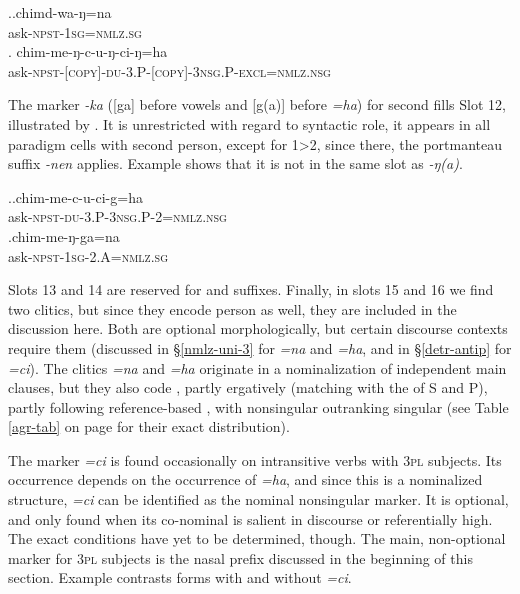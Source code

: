 	\ex.\ag.chimd-wa-ŋ=na\\
	ask{\scshape -npst-1sg=nmlz.sg}\\
	\bg. chim-me-ŋ-c-u-ŋ-ci-ŋ=ha\\
	ask{\scshape -npst-[copy]-du-3.P-[copy]-3nsg.P-excl=nmlz.nsg}\\
		
		
The marker \emph{-ka} ([ga] before vowels and [g(a)] before \emph{=ha}) for second  fills Slot 12, illustrated by  \Next. It is unrestricted with regard to syntactic role, it appears in all paradigm cells with second person, except for 1>2, since there, the portmanteau suffix \emph{-nen} applies. Example \Next[b] shows that it is not in the same slot as \emph{-ŋ(a)}.

\ex.\ag.chim-me-c-u-ci-g=ha\\
	ask{\scshape -npst-du-3.P-3nsg.P-2=nmlz.nsg}\\
	\bg.chim-me-ŋ-ga=na\\
	ask{\scshape -npst-1sg-2.A=nmlz.sg}\\
	
	
Slots  13 and 14 are reserved for  and  suffixes. Finally, in slots 15 and 16 we find two clitics, but since they encode person as well, they are included in the discussion here. Both are optional morphologically, but certain discourse contexts require them (discussed in §\ref{nmlz-uni-3} for \emph{=na} and \emph{=ha}, and in §\ref{detr-antip} for \emph{=ci}). The clitics \emph{=na} and \emph{=ha} originate in a nominalization of independent main clauses, but they also code , partly ergatively (matching with the  of S and P), partly following reference-based , with nonsingular outranking singular (see Table \ref{agr-tab} on page \pageref{agr-tab} for their exact distribution).

The marker \emph{=ci} is found occasionally on intransitive verbs with {\scshape 3pl} subjects. Its occurrence depends on the occurrence of \emph{=ha}, and since this is a nominalized structure, \emph{=ci} can be identified as the nominal nonsingular marker.  It is optional, and only found when its co-nominal is salient in discourse or referentially high. The exact conditions have yet to be determined, though. The main, non-optional marker for {\scshape 3pl} subjects is the nasal prefix discussed in the beginning of this section. Example \Next contrasts forms with and without \emph{=ci}. 

